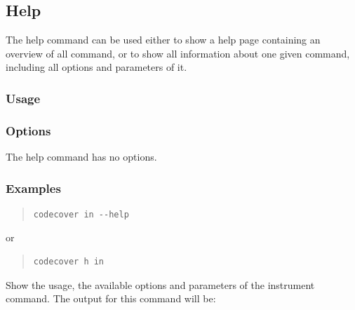 \subsection{Help}\label{Command-Help}
The help command can be used either to show a help page containing an overview of all command, or to show all information about one given command, including all options and parameters of it.
\subsubsection{Usage}\label{command:help:usage}
\begin{quote}
\end{quote}

\subsubsection{Options}\label{command:help:options}
The help command has no options.

\subsubsection{Examples} \label{command:help:examples}
\begin{quote}
\begin{verbatim}
codecover in --help
\end{verbatim}
\end{quote}
or
\begin{quote}
\begin{verbatim}
codecover h in
\end{verbatim}
\end{quote}

Show the usage, the available options and parameters of the instrument command.
The output for this command will be:

